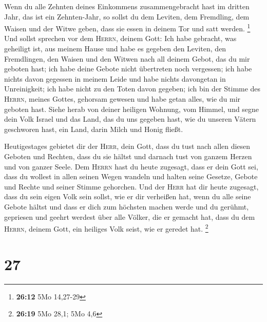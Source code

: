  Wenn du alle Zehnten deines Einkommens zusammengebracht
hast im dritten Jahr, das ist ein Zehnten-Jahr, so sollst du dem
Leviten, dem Fremdling, dem Waisen und der Witwe geben, dass sie essen
in deinem Tor und satt werden. \footnote{\textbf{26:12} 5Mo 14,27-29}
 Und sollst sprechen vor dem \textsc{Herrn}, deinem Gott:
Ich habe gebracht, was geheiligt ist, aus meinem Hause und habe es
gegeben den Leviten, den Fremdlingen, den Waisen und den Witwen nach all
deinem Gebot, das du mir geboten hast; ich habe deine Gebote nicht
übertreten noch vergessen;  ich habe nichts davon
gegessen in meinem Leide und habe nichts davongetan in Unreinigkeit; ich
habe nicht zu den Toten davon gegeben; ich bin der Stimme des
\textsc{Herrn}, meines Gottes, gehorsam gewesen und habe getan alles,
wie du mir geboten hast.  Siehe herab von deiner heiligen
Wohnung, vom Himmel, und segne dein Volk Israel und das Land, das du uns
gegeben hast, wie du unseren Vätern geschworen hast, ein Land, darin
Milch und Honig fließt.

 Heutigestages gebietet dir der \textsc{Herr}, dein Gott,
dass du tust nach allen diesen Geboten und Rechten, dass du sie hältst
und darnach tust von ganzem Herzen und von ganzer Seele. 
Dem \textsc{Herrn} hast du heute zugesagt, dass er dein Gott sei, dass
du wollest in allen seinen Wegen wandeln und halten seine Gesetze,
Gebote und Rechte und seiner Stimme gehorchen.  Und der
\textsc{Herr} hat dir heute zugesagt, dass du sein eigen Volk sein
sollst, wie er dir verheißen hat, wenn du alle seine Gebote hältst
 und dass er dich zum höchsten machen werde und du
gerühmt, gepriesen und geehrt werdest über alle Völker, die er gemacht
hat, dass du dem \textsc{Herrn}, deinem Gott, ein heiliges Volk seist,
wie er geredet hat. \footnote{\textbf{26:19} 5Mo 28,1; 5Mo 4,6}

\hypertarget{section-6}{%
\section{27}\label{section-6}}

